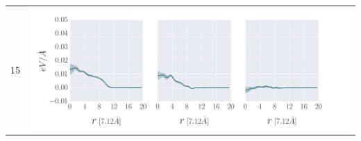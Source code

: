 \documentclass[twoside,english]{uiofysmaster}
\begin{document}
\begin{table}[H]
\begin{tabular}{cr}
		15 & \parbox[c]{0.83\linewidth}{
			\includegraphics[width=\linewidth, trim={8mm 0 35mm 3mm}, clip]{figures/forceDistribution/radialResults/timestep_085000.pdf}
		}\\
	\end{tabular}
\end{table}
\end{document}
